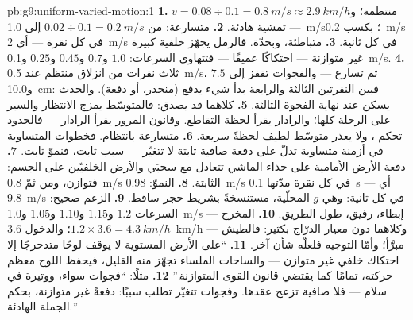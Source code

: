 \begin{solution}{pb:g9:uniform-varied-motion:1}
\textbf{1.} منتظمة؛ و$v = 0.08 \div 0.1 = \qty{0.8}{m/s}
\approx \qty{2.9}{km/h}$ --- تمشية هادئة.
\textbf{2.} متسارعة: من $0.02 \div 0.1 = \qty{0.2}{m/s}$ إلى
\qty{1.0}{m/s}؛ بكسب \qty{0.2}{m/s} في كل نقرة --- أي
\qty{2}{m/s} في كل ثانية.
\textbf{3.} متباطئة، وبحدّة. فالرمل يجهّز  خلفية كبيرة غير
متوازنة --- احتكاكًا عميقًا --- فتتهاوى السرعات: $1.0$ و$0.7$
و$0.45$ و$0.25$ و\qty{0.1}{m/s}.
\textbf{4.} ثلاث نقرات من انزلاق منتظم عند \qty{0.5}{m/s}، ثم
تسارع --- والفجوات تقفز إلى $7.5$ و\qty{10.0}{cm}: فبين
النقرتين الثالثة والرابعة بدأ شيء يدفع (منحدر، أو دفعة).
والحدث يسكن عند نهاية الفجوة الثالثة.
\textbf{5.} كلاهما قد يصدق: فالمتوسّط يمزج الانتظار والسير
على الرحلة كلها؛ والرادار يقرأ لحظة التقاطع. وقانون المرور
يقرأ الرادار --- فالحدود تحكم ، ولا يعذر متوسّط
لطيف لحظةً سريعة.
\textbf{6.} متسارعة بانتظام. فخطوات  المتساوية في أزمنة
متساوية تدلّ على دفعة صافية ثابتة لا تتغيّر --- سبب ثابت،
فنموّ ثابت.
\textbf{7.} دفعة الأرض الأمامية على حذاء الماشي تتعادل مع
سحبَي  والأرض الخلفيّين على الجسم: فتوازن، ومن ثمّ
\qty{0.8}{m/s} الثابتة.
\textbf{8.} النموّ: \qty{0.98}{m/s} في كل نقرة مدّتها
\qty{0.1}{s} --- أي \qty{9.8}{m/s} في كل ثانية: وهي $g$
المحلّية، مستنسخةً بشريط حجر ساقط.
\textbf{9.} الزعم صحيح: السرعات $1.2$ و$1.15$ و$1.10$ و$1.05$
و\qty{1.0}{m/s} --- إبطاء، رفيق، طول الطريق.
\textbf{10.} المخرج $1.2 \times 3.6 = \qty{4.3}{km/h}$؛
والدخول \qty{3.6}{km/h} --- وكلاهما دون معيار الدرّاج بكثير:
فالطيش مبرَّأ؛ وأمّا التوجيه فلعلّه شأن آخر.
\textbf{11.} ``على الأرض المستوية لا يوقف لوحًا متدحرجًا إلا
احتكاك خلفي غير متوازن --- والساحات الملساء تجهّز منه القليل،
فيحفظ اللوح معظم حركته، تمامًا كما يقتضي قانون القوى
المتوازنة.''
\textbf{12.} مثلًا: ``فجوات سواء، ووتيرة في سلام --- فلا 
صافية تزعج عقدها. وفجوات تتغيّر تطلب سببًا: دفعةً غير متوازنة،
بحكم الجملة الهادئة.''
\end{solution}
